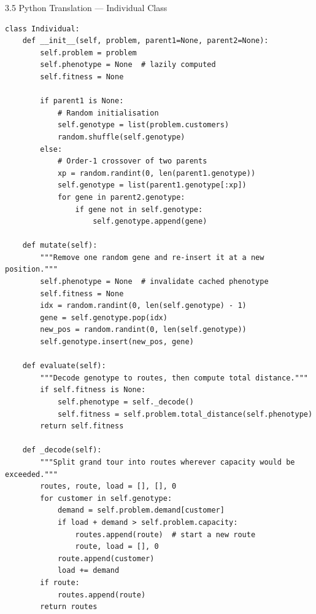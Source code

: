 \documentclass[aspectratio=169,10pt]{beamer}
\begin{document}
\begin{frame}[fragile]{3.5 Python Translation — Individual Class}

  \begin{lstlisting}[style=pythonstyle,caption={Python: Individual class with genotype/phenotype}]
class Individual:
    def __init__(self, problem, parent1=None, parent2=None):
        self.problem = problem
        self.phenotype = None  # lazily computed
        self.fitness = None

        if parent1 is None:
            # Random initialisation
            self.genotype = list(problem.customers)
            random.shuffle(self.genotype)
        else:
            # Order-1 crossover of two parents
            xp = random.randint(0, len(parent1.genotype))
            self.genotype = list(parent1.genotype[:xp])
            for gene in parent2.genotype:
                if gene not in self.genotype:
                    self.genotype.append(gene)

    def mutate(self):
        """Remove one random gene and re-insert it at a new position."""
        self.phenotype = None  # invalidate cached phenotype
        self.fitness = None
        idx = random.randint(0, len(self.genotype) - 1)
        gene = self.genotype.pop(idx)
        new_pos = random.randint(0, len(self.genotype))
        self.genotype.insert(new_pos, gene)

    def evaluate(self):
        """Decode genotype to routes, then compute total distance."""
        if self.fitness is None:
            self.phenotype = self._decode()
            self.fitness = self.problem.total_distance(self.phenotype)
        return self.fitness

    def _decode(self):
        """Split grand tour into routes wherever capacity would be exceeded."""
        routes, route, load = [], [], 0
        for customer in self.genotype:
            demand = self.problem.demand[customer]
            if load + demand > self.problem.capacity:
                routes.append(route)  # start a new route
                route, load = [], 0
            route.append(customer)
            load += demand
        if route:
            routes.append(route)
        return routes
  \end{lstlisting}

\end{frame}
\end{document}

